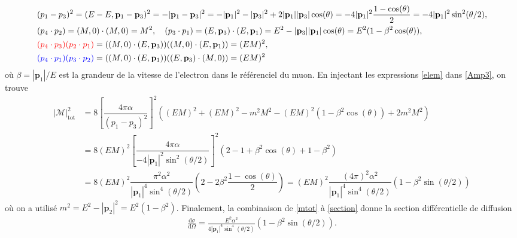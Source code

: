 {\begin{alphaparts}
    \begin{align}
        &(p_1 -  p_3)^2 = (E-E, \mathbf{p}_1 - \mathbf{p}_3)^2 = - |\mathbf{p}_1 - \mathbf{p}_3|^2 = -|\mathbf{p}_1|^2 - |\mathbf{p}_3|^2 + 2 |\mathbf{p}_1||\mathbf{p}_3|\cos(\theta) = -4|\mathbf{p}_1|^2 \dfrac{1 - \cos(\theta)}{2} = -4|\mathbf{p}_1|^2 \sin^2(\theta/2),\nonumber\\
        &(p_4 \cdot p_2) = (M, 0) \cdot (M, 0) = M^2, \quad (p_3 \cdot p_1) = (E, \mathbf{p}_3) \cdot (E, \mathbf{p}_1) = E^2 - |\mathbf{p}_3||\mathbf{p}_1| \cos(\theta) = E^2 (1 - \beta^2 \cos(\theta)),
        \nonumber\\
        &\textcolor{red}{(p_4 \cdot p_3)(p_2 \cdot p_1)} =  ((M, 0) \cdot (E, \mathbf{p}_3))((M, 0) \cdot (E, \mathbf{p}_1))= (EM)^2, \nonumber\\
        &\textcolor{blue}{(p_4 \cdot p_1)(p_3 \cdot p_2)} =  ((M, 0) \cdot (E, \mathbf{p}_1))((E, \mathbf{p}_3) \cdot (M, 0))= (EM)^2\label{elem}
    \end{align}
    où $\beta = |\mathbf{p}_1|/E$ est la grandeur de la vitesse de l'electron dans le référenciel du muon.  En injectant les expressions \eqref{elem} dans \eqref{Amp3}, on trouve 
    \begin{align}
        |\mathcal{M}|_{\text{tot}}^2 &= 8\left[\dfrac{4 \pi \alpha}{(p_1 - p_3)^2}\right]^2 \left((EM)^2+(EM)^2 - m^2 M^2 - (EM)^2 (1 - \beta^2 \cos(\theta)) + 2 m^2 M^2 \right)\nonumber\\
        &= 8(EM)^2\left[\dfrac{4 \pi \alpha}{-4|\mathbf{p}_1|^2 \sin^2(\theta/2)}\right]^2 \left(2 - 1 + \beta^2 \cos(\theta) + 1-\beta^2\right)\nonumber\\
        &= 8(EM)^2\dfrac{\pi^2 \alpha^2}{|\mathbf{p}_1|^4 \sin^4(\theta/2)} \left(2 - 2 \beta^2 \dfrac{1- \cos(\theta)}{2}\right)= (EM)^2\dfrac{(4\pi)^2 \alpha^2}{|\mathbf{p}_1|^4 \sin^4(\theta/2)} \left(1 - \beta^2 \sin(\theta/2)\right) \label{mtot}
    \end{align}
    où on a utilisé $m^2 = E^2 - |\mathbf{p}_2|^2 = E^2(1-\beta^2)$. Finalement, la combinaison de \eqref{mtot} à \eqref{section} donne la section différentielle de diffusion 
    \begin{align}
        \frac{\mathrm{d} \sigma}{\mathrm{d} \Omega} = \frac{E^2\alpha^2}{4 |\mathbf{p}_1|^4 \sin^4(\theta/2)}\left(1 - \beta^2 \sin(\theta/2)\right).
    \end{align}
\end{alphaparts}
}
